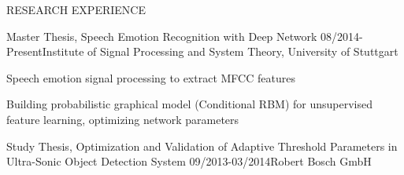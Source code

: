 \documentclass{resume} %
\begin{document}
\begin{rSection}{RESEARCH  EXPERIENCE}

\begin{rSubsection}{Master Thesis,  Speech Emotion Recognition with Deep Network
}{08/2014-Present}{}{Institute of Signal Processing and System Theory, University of Stuttgart}

\item Speech emotion signal processing to extract MFCC features
\item Building probabilistic graphical model (Conditional RBM) for unsupervised feature learning, optimizing network parameters
\item 

\end{rSubsection}


\begin{rSubsection}{Study Thesis, Optimization and Validation of Adaptive Threshold Parameters in Ultra-Sonic Object Detection System 
}{09/2013-03/2014}{}{Robert Bosch GmbH}


\end{rSubsection}
\end{rSection}
\end{document}
